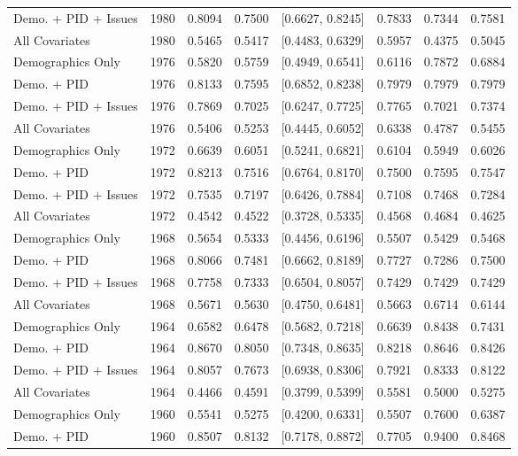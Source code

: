 \begin{longtable}{lrrrlrrr}
  Demo. + PID + Issues & 1980 & 0.8094 & 0.7500 & [0.6627, 0.8245] & 0.7833 & 0.7344 & 0.7581 \\ 
  All Covariates & 1980 & 0.5465 & 0.5417 & [0.4483, 0.6329] & 0.5957 & 0.4375 & 0.5045 \\ 
  Demographics Only & 1976 & 0.5820 & 0.5759 & [0.4949, 0.6541] & 0.6116 & 0.7872 & 0.6884 \\ 
  Demo. + PID & 1976 & 0.8133 & 0.7595 & [0.6852, 0.8238] & 0.7979 & 0.7979 & 0.7979 \\ 
  Demo. + PID + Issues & 1976 & 0.7869 & 0.7025 & [0.6247, 0.7725] & 0.7765 & 0.7021 & 0.7374 \\ 
  All Covariates & 1976 & 0.5406 & 0.5253 & [0.4445, 0.6052] & 0.6338 & 0.4787 & 0.5455 \\ 
  Demographics Only & 1972 & 0.6639 & 0.6051 & [0.5241, 0.6821] & 0.6104 & 0.5949 & 0.6026 \\ 
  Demo. + PID & 1972 & 0.8213 & 0.7516 & [0.6764, 0.8170] & 0.7500 & 0.7595 & 0.7547 \\ 
  Demo. + PID + Issues & 1972 & 0.7535 & 0.7197 & [0.6426, 0.7884] & 0.7108 & 0.7468 & 0.7284 \\ 
  All Covariates & 1972 & 0.4542 & 0.4522 & [0.3728, 0.5335] & 0.4568 & 0.4684 & 0.4625 \\ 
  Demographics Only & 1968 & 0.5654 & 0.5333 & [0.4456, 0.6196] & 0.5507 & 0.5429 & 0.5468 \\ 
  Demo. + PID & 1968 & 0.8066 & 0.7481 & [0.6662, 0.8189] & 0.7727 & 0.7286 & 0.7500 \\ 
  Demo. + PID + Issues & 1968 & 0.7758 & 0.7333 & [0.6504, 0.8057] & 0.7429 & 0.7429 & 0.7429 \\ 
  All Covariates & 1968 & 0.5671 & 0.5630 & [0.4750, 0.6481] & 0.5663 & 0.6714 & 0.6144 \\ 
  Demographics Only & 1964 & 0.6582 & 0.6478 & [0.5682, 0.7218] & 0.6639 & 0.8438 & 0.7431 \\ 
  Demo. + PID & 1964 & 0.8670 & 0.8050 & [0.7348, 0.8635] & 0.8218 & 0.8646 & 0.8426 \\ 
  Demo. + PID + Issues & 1964 & 0.8057 & 0.7673 & [0.6938, 0.8306] & 0.7921 & 0.8333 & 0.8122 \\ 
  All Covariates & 1964 & 0.4466 & 0.4591 & [0.3799, 0.5399] & 0.5581 & 0.5000 & 0.5275 \\ 
  Demographics Only & 1960 & 0.5541 & 0.5275 & [0.4200, 0.6331] & 0.5507 & 0.7600 & 0.6387 \\ 
  Demo. + PID & 1960 & 0.8507 & 0.8132 & [0.7178, 0.8872] & 0.7705 & 0.9400 & 0.8468 \\ 

\end{longtable}
